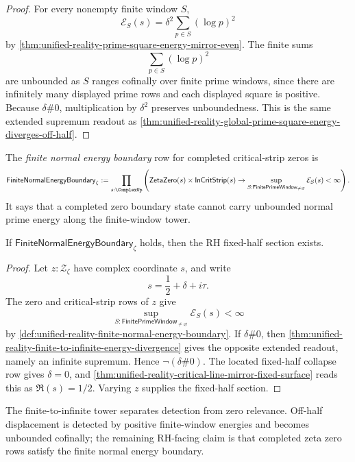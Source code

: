 \begin{proof}
For every nonempty finite window $S$,
$$
\mathcal E_S(s)
=
\delta^2\sum_{p\in S}(\log p)^2
$$
by
\autoref{thm:unified-reality-prime-square-energy-mirror-even}.  The
finite sums
$$
\sum_{p\in S}(\log p)^2
$$
are unbounded as $S$ ranges cofinally over finite prime windows, since
there are infinitely many displayed prime rows and each displayed square
is positive.  Because $\delta\#0$, multiplication by $\delta^2$ preserves
unboundedness.  This is the same extended supremum readout as
\autoref{thm:unified-reality-global-prime-square-energy-diverges-off-half}.
\end{proof}

\begin{definition}
\label{def:unified-reality-finite-normal-energy-boundary}
The \emph{finite normal energy boundary} row for completed critical-strip
zeros is
$$
\mathsf{FiniteNormalEnergyBoundary}_{\zeta}
:=
\prod_{s:\ComplexUp}
\left(
\mathsf{ZetaZero}(s)
\times
\mathsf{InCritStrip}(s)
\to
\sup_{S:\mathsf{FinitePrimeWindow}_{\ne\varnothing}}
\mathcal E_S(s)
<\infty
\right).
$$
It says that a completed zero boundary state cannot carry unbounded
normal prime energy along the finite-window tower.
\end{definition}

\begin{theorem}
\label{thm:unified-reality-finite-normal-energy-boundary-conditionally-sufficient}
If $\mathsf{FiniteNormalEnergyBoundary}_{\zeta}$ holds, then the RH
fixed-half section exists.
\end{theorem}

\begin{proof}
Let $z:\mathcal Z_{\zeta}$ have complex coordinate $s$, and write
$$
s=\frac12+\delta+i\tau.
$$
The zero and critical-strip rows of $z$ give
$$
\sup_{S:\mathsf{FinitePrimeWindow}_{\ne\varnothing}}
\mathcal E_S(s)
<\infty
$$
by
\autoref{def:unified-reality-finite-normal-energy-boundary}.  If
$\delta\#0$, then
\autoref{thm:unified-reality-finite-to-infinite-energy-divergence}
gives the opposite extended readout, namely an infinite supremum.  Hence
$\neg(\delta\#0)$.  The located fixed-half collapse row gives
$\delta=0$, and
\autoref{thm:unified-reality-critical-line-mirror-fixed-surface} reads
this as $\Re(s)=1/2$.  Varying $z$ supplies the fixed-half section.
\end{proof}

\begin{corollary}
\label{cor:unified-reality-finite-to-infinite-tracking-proof-load}
The finite-to-infinite tower separates detection from zero relevance.
Off-half displacement is detected by positive finite-window energies and
becomes unbounded cofinally; the remaining RH-facing claim is that
completed zeta zero rows satisfy the finite normal energy boundary.
\end{corollary}

